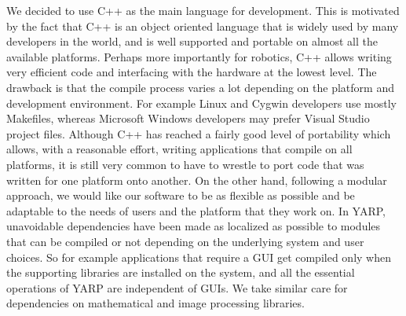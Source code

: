 We decided to use C++ as the main language for development. This 
is motivated by the fact that C++ is an object oriented language
that is widely used by many developers in the world, and is well 
supported and portable on almost all the available platforms. 
Perhaps more importantly for robotics, C++ allows writing very 
efficient code and interfacing with the hardware at the lowest 
level.
%
The drawback is that the compile process varies a lot depending 
on the platform and development environment. For example Linux 
and Cygwin developers use mostly Makefiles, whereas Microsoft Windows 
developers may prefer Visual Studio project files. 
Although C++ has reached a fairly good level 
of portability which allows, with a reasonable effort, writing 
applications that compile on all platforms, it is still very 
common to have to wrestle to port code that was written for 
one platform onto another. On the other hand, following a 
modular approach, we would like our software to be as flexible 
as possible and be adaptable to the needs of users and the platform that 
they work on. In YARP, unavoidable dependencies 
have been made as localized as possible to modules that can be 
compiled or not depending on the underlying system and user 
choices. So for example applications that require a GUI get
compiled only when the supporting libraries
%
%
are installed on the system, and all the essential operations
of YARP are independent of GUIs.
%
%
We take similar care for dependencies on mathematical and 
image processing libraries.
%

